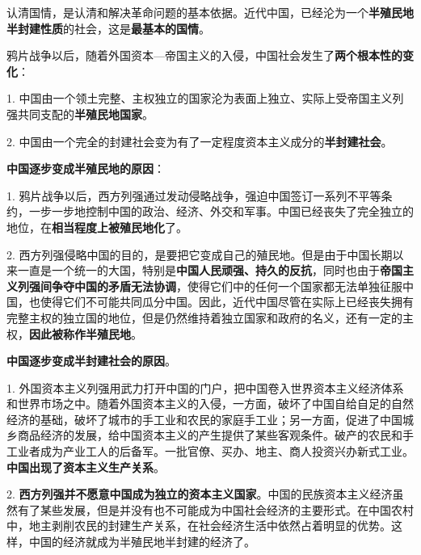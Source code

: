 {认清国情，是认清和解决革命问题的基本依据}。近代中国，已经沦为一个\textbf{{半殖民地半封建性质}}的社会，这是\textbf{{最基本的国情}}。

鸦片战争以后，随着外国资本---帝国主义的入侵，中国社会发生了\textbf{{两个根本性的变化}}：

1.
中国由一个领土完整、主权独立的国家沦为表面上独立、实际上受帝国主义列强共同支配的\textbf{{半殖民地国家}}。

2.
中国由一个完全的封建社会变为有了一定程度资本主义成分的\textbf{{半封建社会}}。

\textbf{{中国逐步变成半殖民地的原因}}：

1.
鸦片战争以后，西方列强通过发动侵略战争，强迫中国签订一系列不平等条约，一步一步地控制中国的政治、经济、外交和军事。中国已经丧失了完全独立的地位，在\textbf{{相当程度上被殖民地化}}了。

2.
西方列强侵略中国的目的，是要把它变成自己的殖民地。但是由于中国长期以来一直是一个统一的大国，特别是\textbf{{中国人民顽强、持久的反抗}}，同时也由于\textbf{{帝国主义列强间争夺中国的矛盾无法协调}}，使得它们中的任何一个国家都无法单独征服中国，也使得它们不可能共同瓜分中国。因此，近代中国尽管在实际上已经丧失拥有完整主权的独立国的地位，但是仍然维持着独立国家和政府的名义，还有一定的主权，\textbf{{因此被称作半殖民地}}。

\textbf{{中国逐步变成半封建社会的原因}}{。}

{1.
外国资本主义列强用武力打开中国的门户，把中国卷入世界资本主义经济体系和世界市场之中。随着外国资本主义的入侵，一方面，}{破坏了中}{国自给自足的自然经济的基础，破坏了城市的手工业和农民的家庭手工业；另一方面，促进了中国城乡商品经济的发展，给中国资本主义的产生提供了某些客观条件。}{破产的农民和手工业者成为产业工人的后备军。一批官僚、买办、地主、商人投资兴办新式工业。}\textbf{{中国出现了资本主义生产关系}}{。}

{2.
}\textbf{{西方列强并不愿意中国成为独立的资本主义国家}}{。中国的民族资本主义经济虽然有了某些发展，但是并没有也不可能成为中国社会经济的主要形式。在中国农村中，地主剥削农民的封建生产关系，在社会经济生活中依然占着明显的优势。这样，中国的经济就成为半殖民地半封建的经济了。}
